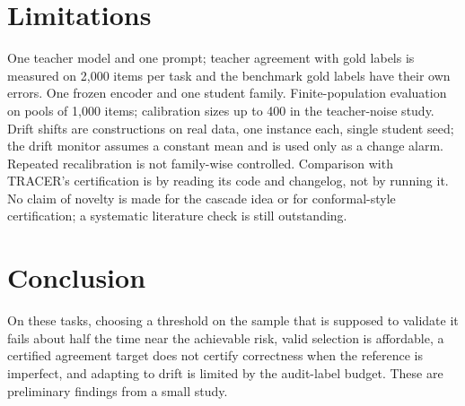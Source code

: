 \documentclass[11pt]{article}
\begin{document}
\begin{table}[t]\centering\footnotesize

\caption{Banking77 drift streams, 10\% audit rate, 100 streams per cell, $\alpha=0.05$; ``blocks
$>\alpha$'' is the share of 500-decision post-shift blocks whose accepted-risk exceeds $\alpha$
(generated from \texttt{results/exp2\_*}).}\label{tab:exp2}\end{table}

\section{Limitations}
One teacher model and one prompt; teacher agreement with gold labels is measured on 2{,}000 items
per task and the benchmark gold labels have their own errors. One frozen encoder and one student
family. Finite-population evaluation on pools of 1{,}000 items; calibration sizes up to 400 in the
teacher-noise study. Drift shifts are constructions on real data, one instance each, single student
seed; the drift monitor assumes a constant mean and is used only as a change alarm. Repeated
recalibration is not family-wise controlled. Comparison with TRACER's certification is by reading
its code and changelog, not by running it. No claim of novelty is made for the cascade idea or for
conformal-style certification; a systematic literature check is still outstanding.

\section{Conclusion}
On these tasks, choosing a threshold on the sample that is supposed to validate it fails about half
the time near the achievable risk, valid selection is affordable, a certified agreement target does
not certify correctness when the reference is imperfect, and adapting to drift is limited by the
audit-label budget. These are preliminary findings from a small study.



\end{document}
